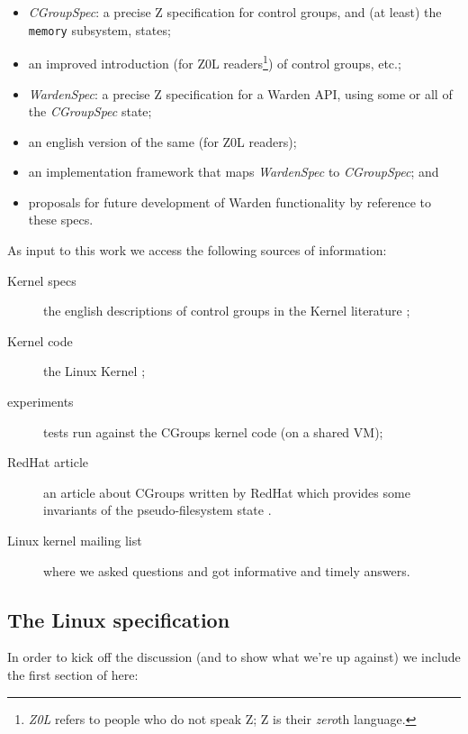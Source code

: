 \documentclass[a4paper,twoside,12pt]{article}
\begin{document}
\begin{itemize}
\item \emph{CGroupSpec}: a precise Z specification for control groups, and (at least) the \texttt{memory} subsystem, states;
\item an improved introduction (for Z0L readers\footnote{\emph{Z0L} refers to people who do not speak Z; Z is their \emph{zero}th language.}) of control groups, etc.;
\item \emph{WardenSpec}: a precise Z specification for a Warden API, using some or all of the \emph{CGroupSpec} state;
\item an english version of the same (for Z0L readers);
\item an implementation framework that maps \emph{WardenSpec} to \emph{CGroupSpec}; and
\item proposals for future development of Warden functionality by reference to these specs.
\end{itemize}
As input to this work we access the following sources of information:
\begin{description}
\item[Kernel specs] the english descriptions of control groups in the Kernel literature \cite{linuxgroups};
\item[Kernel code] the Linux Kernel \cite{linuxkernel};
\item[experiments] tests run against the CGroups kernel code (on a shared VM);
\item[RedHat article] an article about CGroups written by RedHat which provides some invariants of the pseudo-filesystem state \cite{rharticle}.
\item[Linux kernel mailing list] \cite{noop} where we asked questions and got informative and timely answers.
\end{description}

\subsection{The Linux specification \cite{linuxgroups}}

In order to kick off the discussion (and to show what we're up against) we include the first section of \cite{linuxgroups} here:
\end{document}
